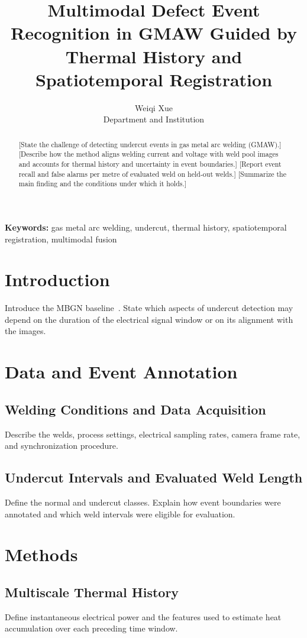 \documentclass[11pt,a4paper]{article}
\title{Multimodal Defect Event Recognition in GMAW Guided by Thermal History and Spatiotemporal Registration}
\author{Weiqi Xue\\Department and Institution}
\date{}
\begin{document}
\maketitle

\begin{abstract}
[State the challenge of detecting undercut events in gas metal arc welding (GMAW).]
[Describe how the method aligns welding current and voltage with weld pool images and accounts for thermal history and uncertainty in event boundaries.]
[Report event recall and false alarms per metre of evaluated weld on held-out welds.]
[Summarize the main finding and the conditions under which it holds.]
\end{abstract}
\noindent\textbf{Keywords:} gas metal arc welding, undercut, thermal history, spatiotemporal registration, multimodal fusion

\section{Introduction}
Introduce the MBGN baseline~\cite{mbgn_placeholder}. State which aspects of undercut detection may depend on the duration of the electrical signal window or on its alignment with the images.

\section{Data and Event Annotation}
\subsection{Welding Conditions and Data Acquisition}
Describe the welds, process settings, electrical sampling rates, camera frame rate, and synchronization procedure.
\subsection{Undercut Intervals and Evaluated Weld Length}
Define the normal and undercut classes. Explain how event boundaries were annotated and which weld intervals were eligible for evaluation.

\section{Methods}
\subsection{Multiscale Thermal History}
Define instantaneous electrical power and the features used to estimate heat accumulation over each preceding time window.
\end{document}
